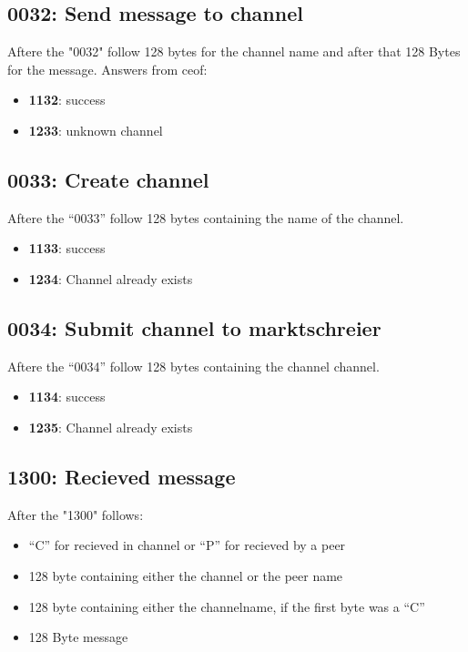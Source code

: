 \documentclass[12pt,a4paper]{book}
\begin{document}
\subsection{0032: Send message to channel}
Aftere the "0032" follow 128 bytes for the channel name and after
that 128 Bytes for the message.
Answers from ceof:
\begin{itemize}
\item \textbf{1132}: success
\item \textbf{1233}: unknown channel
\end{itemize}
\subsection{0033: Create channel}
Aftere the "`0033"' follow 128 bytes containing the name of the channel.
\begin{itemize}
\item \textbf{1133}: success
\item \textbf{1234}: Channel already exists
\end{itemize}
\subsection{0034: Submit channel to marktschreier}
Aftere the "`0034"' follow 128 bytes containing the channel channel.
\begin{itemize}
\item \textbf{1134}: success
\item \textbf{1235}: Channel already exists
\end{itemize}
\subsection{1300: Recieved message}
After the "1300" follows:
\begin{itemize}
\item "`C"' for recieved in channel or "`P"' for recieved by a peer
\item 128 byte containing either the channel or the peer name
\item 128 byte containing either the channelname, if the first byte was a "`C"'
\item 128 Byte message
\end{itemize}
\end{document}
